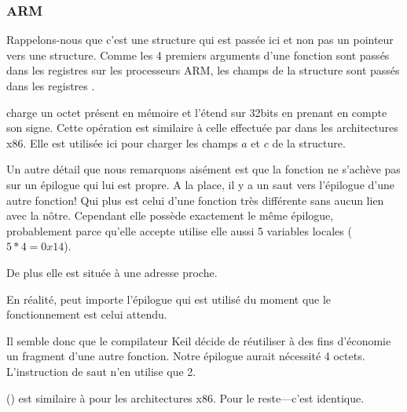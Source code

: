 ﻿\subsubsection{ARM}

\myparagraph{\OptimizingKeilVI (\ThumbMode)}



Rappelons-nous que c'est une structure qui est passée ici et non pas un pointeur vers une structure. Comme 
les 4 premiers arguments d'une fonction sont passés dans les registres sur les processeurs ARM, les champs 
de la structure sont passés dans les registres .

 charge un octet présent en mémoire et l'étend sur 32bits en prenant en compte son signe. Cette 
opération est similaire à celle effectuée par \MOVSX dans les architectures x86. Elle est utilisée ici pour 
charger les champs $a$ et $c$ de la structure.


Un autre détail que nous remarquons aisément est que la fonction ne s'achève pas sur un épilogue qui lui est 
propre. A la place, il y a un saut vers l'épilogue d'une autre fonction! Qui plus est celui d'une fonction 
très différente sans aucun lien avec la nôtre. Cependant elle possède exactement le même épilogue, 
probablement parce qu'elle accepte utilise elle aussi 5 variables locales ($5*4=0x14$).

De plus elle est située à une adresse proche.

En réalité, peut importe l'épilogue qui est utilisé du moment que le fonctionnement est celui attendu.

Il semble donc que le compilateur Keil décide de réutiliser à des fins d'économie un fragment d'une autre 
fonction. Notre épilogue aurait nécessité 4 octets. L'instruction de saut n'en utilise que 2.




 () est similaire à \MOVSX pour les architectures x86.
Pour le reste---c'est identique.
